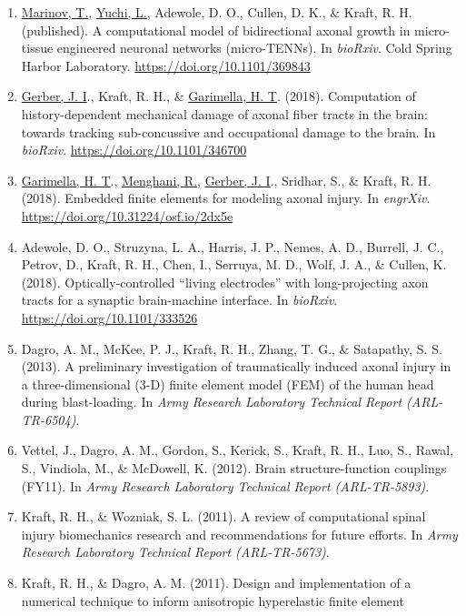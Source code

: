 \documentclass[11pt]{article}
\begin{document}
\begin{enumerate}
\def\labelenumi{\arabic{enumi}.}
\item
  \underline{Marinov, T.}, \underline{Yuchi, L.}, Adewole, D. 
O., Cullen, D. 
K., \& Kraft, R. 
H.
  (published). 
A computational model of bidirectional axonal growth in
  micro-tissue engineered neuronal networks (micro-TENNs). 
In
  \emph{bioRxiv}. 
Cold Spring Harbor Laboratory.
  \url{https://doi.org/10.1101/369843}
\item
  \underline{Gerber, J. 
I}., Kraft, R. 
H., \& \underline{Garimella, H. 
T}. 
(2018). 
Computation
  of history-dependent mechanical damage of axonal fiber tracts in the
  brain: towards tracking sub-concussive and occupational damage to the
  brain. 
In \emph{bioRxiv}. 
\url{https://doi.org/10.1101/346700}
\item
  \underline{Garimella, H. 
T}., \underline{Menghani, R.}, \underline{Gerber, J. 
I}., Sridhar, S., \& Kraft,
  R. 
H. 
(2018). 
Embedded finite elements for modeling axonal injury. 
In
  \emph{engrXiv}. 
\url{https://doi.org/10.31224/osf.io/2dx5e}
\item
  Adewole, D. 
O., Struzyna, L. 
A., Harris, J. 
P., Nemes, A. 
D., Burrell,
  J. 
C., Petrov, D., Kraft, R. 
H., Chen, I., Serruya, M. 
D., Wolf, J.
  A., \& Cullen, K. 
(2018). 
Optically-controlled ``living electrodes''
  with long-projecting axon tracts for a synaptic brain-machine
  interface. 
In \emph{bioRxiv}. 
\url{https://doi.org/10.1101/333526}
\item
  Dagro, A. 
M., McKee, P. 
J., Kraft, R. 
H., Zhang, T. 
G., \& Satapathy,
  S. 
S. 
(2013). 
A preliminary investigation of traumatically induced
  axonal injury in a three-dimensional (3-D) finite element model (FEM)
  of the human head during blast-loading. 
In \emph{Army Research
  Laboratory Technical Report (ARL-TR-6504)}.
\item
  Vettel, J., Dagro, A. 
M., Gordon, S., Kerick, S., Kraft, R. 
H., Luo,
  S., Rawal, S., Vindiola, M., \& McDowell, K. 
(2012). 
Brain
  structure-function couplings (FY11). 
In \emph{Army Research Laboratory
  Technical Report (ARL-TR-5893)}.
\item
  Kraft, R. 
H., \& Wozniak, S. 
L. 
(2011). 
A review of computational
  spinal injury biomechanics research and recommendations for future
  efforts. 
In \emph{Army Research Laboratory Technical Report
  (ARL-TR-5673)}.
\item
  Kraft, R. 
H., \& Dagro, A. 
M. 
(2011). 
Design and implementation of a
  numerical technique to inform anisotropic hyperelastic finite element

\end{enumerate}
\end{document}
